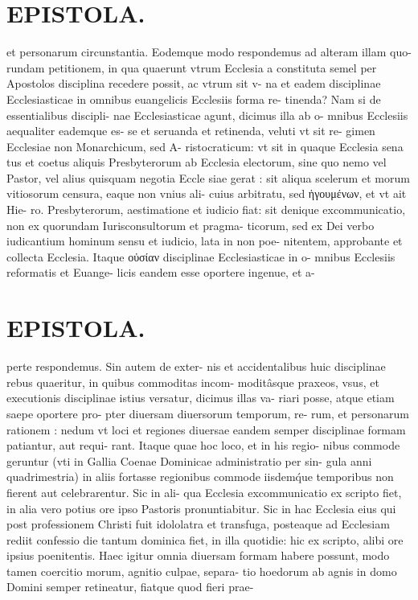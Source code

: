 \documentclass{article}
\begin{document}
\begin{pages}
\section*{EPISTOLA. }\pstart et personarum circunstantia. Eodemque modo respondemus ad alteram illam quo- rundam petitionem, in qua quaerunt vtrum Ecclesia a constituta semel per Apostolos disciplina recedere possit, ac vtrum sit v- na et eadem disciplinae Ecclesiasticae in omnibus euangelicis Ecclesiis forma re- tinenda? Nam si de essentialibus discipli- nae Ecclesiasticae agunt, dicimus illa ab o- mnibus Ecclesiis aequaliter eademque es- se et seruanda et retinenda, veluti vt sit re- gimen Ecclesiae non Monarchicum, sed A- ristocraticum: vt sit in quaque Ecclesia sena tus et coetus aliquis Presbyterorum ab Ecclesia electorum, sine quo nemo vel Pastor, vel alius quisquam negotia Eccle siae gerat : sit aliqua scelerum et morum vitiosorum censura, eaque non vnius ali- cuius arbitratu, sed ἡγουμένων, et vt ait Hie- ro. Presbyterorum, aestimatione et iudicio fiat: sit denique excommunicatio, non ex quorundam Iurisconsultorum et pragma- ticorum, sed ex Dei verbo iudicantium hominum sensu et iudicio, lata in non poe- nitentem, approbante et collecta Ecclesia. Itaque οὐσίαν disciplinae Ecclesiasticae in o- mnibus Ecclesiis reformatis et Euange- licis eandem esse oportere ingenue, et a-  \pend
\section*{EPISTOLA. }\pstart perte respondemus. Sin autem de exter- nis et accidentalibus huic disciplinae rebus quaeritur, in quibus commoditas incom- moditâsque praxeos, vsus, et executionis disciplinae istius versatur, dicimus illas va- riari posse, atque etiam saepe oportere pro- pter diuersam diuersorum temporum, re- rum, et personarum rationem : nedum vt loci et regiones diuersae eandem semper disciplinae formam patiantur, aut requi- rant. Itaque quae hoc loco, et in his regio- nibus commode geruntur (vti in Gallia Coenae Dominicae administratio per sin- gula anni quadrimestria) in aliis fortasse regionibus commode iisdemq́ue temporibus non fierent aut celebrarentur. Sic in ali- qua Ecclesia excommunicatio ex scripto fiet, in alia vero potius ore ipso Pastoris pronuntiabitur. Sic in hac Ecclesia eius qui post professionem Christi fuit idololatra et transfuga, posteaque ad Ecclesiam rediit confessio die tantum dominica fiet, in illa quotidie: hic ex scripto, alibi ore ipsius poenitentis. Haec igitur omnia diuersam formam habere possunt, modo tamen coercitio morum, agnitio culpae, separa- tio hoedorum ab agnis in domo Domini semper retineatur, fiatque quod fieri prae-  \pend

\end{pages}
\end{document}
